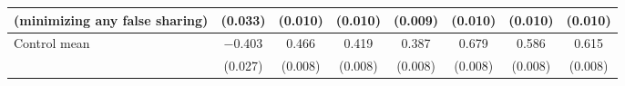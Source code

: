 \begin{tabular}[t]{lccccccc}
 \hspace{1.5em}(minimizing any false sharing) & (\num{0.033}) & (\num{0.010}) & (\num{0.010}) & (\num{0.009}) & (\num{0.010}) & (\num{0.010}) & (\num{0.010})\\\hline
\hspace{1em}Control mean & \num{-0.403} & \num{0.466} & \num{0.419} & \num{0.387} & \num{0.679} & \num{0.586} & \num{0.615}\\
 & (\num{0.027}) & (\num{0.008}) & (\num{0.008}) & (\num{0.008}) & (\num{0.008}) & (\num{0.008}) & (\num{0.008})\\
\end{tabular}
